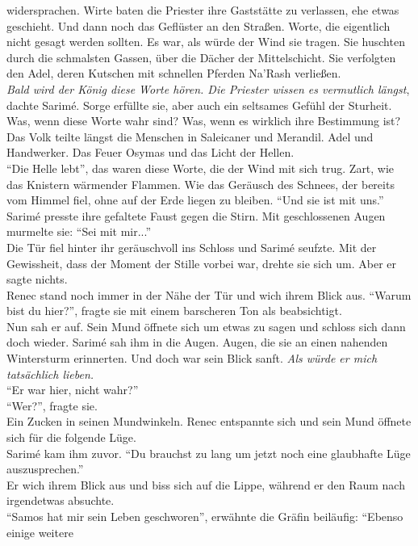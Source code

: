 widersprachen. Wirte baten die Priester ihre Gaststätte zu verlassen, ehe etwas geschieht. Und dann 
noch das Geflüster an den Straßen. Worte, die eigentlich nicht gesagt werden sollten. Es war, als 
würde der Wind sie tragen. Sie huschten durch die schmalsten Gassen, über die Dächer der 
Mittelschicht. Sie verfolgten den Adel, deren Kutschen mit schnellen Pferden Na'Rash verließen.\\
\textit{Bald wird der König diese Worte hören. Die Priester wissen es vermutlich längst}, dachte 
Sarimé. Sorge erfüllte sie, aber auch ein seltsames Gefühl der Sturheit. Was, wenn diese Worte wahr 
sind? Was, wenn es wirklich ihre Bestimmung ist?\\
Das Volk teilte längst die Menschen in Saleicaner und Merandil. Adel und Handwerker. Das Feuer 
Osymas und das Licht der Hellen.\\
``Die Helle lebt'', das waren diese Worte, die der Wind mit sich trug. Zart, wie das Knistern 
wärmender Flammen. Wie das Geräusch des Schnees, der bereits vom Himmel fiel, ohne auf der 
Erde liegen zu bleiben. ``Und sie ist mit uns.''\\
Sarimé presste ihre gefaltete Faust gegen die Stirn. Mit geschlossenen Augen murmelte sie: ``Sei 
mit mir...''\\
Die Tür fiel hinter ihr geräuschvoll ins Schloss und Sarimé seufzte. Mit der Gewissheit, dass der 
Moment der Stille vorbei war, drehte sie sich um. Aber er sagte nichts.\\
Renec stand noch immer in der Nähe der Tür und wich ihrem Blick aus. ``Warum bist du hier?'', 
fragte sie mit einem barscheren Ton als beabsichtigt.\\
Nun sah er auf. Sein Mund öffnete sich um etwas zu sagen und schloss sich dann doch wieder. 
Sarimé sah ihm in die Augen. Augen, die sie an einen nahenden Wintersturm erinnerten. Und doch war 
sein Blick sanft. \textit{Als würde er mich tatsächlich lieben.}\\
``Er war hier, nicht wahr?''\\
``Wer?'', fragte sie.\\
Ein Zucken in seinen Mundwinkeln. Renec entspannte sich und sein Mund öffnete sich für die folgende 
Lüge.\\
Sarimé kam ihm zuvor. ``Du brauchst zu lang um jetzt noch eine glaubhafte Lüge auszusprechen.''\\
Er wich ihrem Blick aus und biss sich auf die Lippe, während er den Raum nach irgendetwas 
absuchte.\\
``Samos hat mir sein Leben geschworen'', erwähnte die Gräfin beiläufig: ``Ebenso einige weitere 
